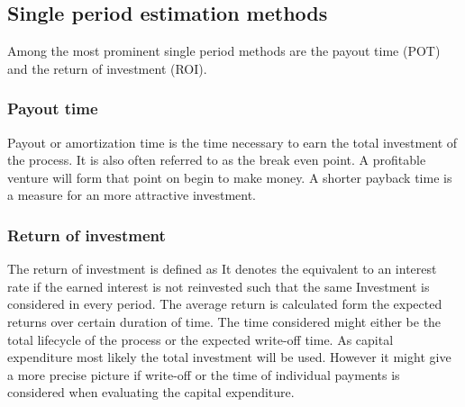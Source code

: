 \subsection{Single period estimation methods}
\label{sec:SinglePeriod}
    Among the most prominent single period methods are the payout time (POT) and the return of
    investment (ROI).

\subsubsection{Payout time}
    Payout or amortization  time is the time necessary to earn the total investment of the process. It is also
    often referred to as the break even point. A profitable venture will form that point on begin to make money.
    A shorter payback time is a measure for an more attractive investment.
\subsubsection{Return of investment}
    The return of investment is defined as
    It denotes the equivalent to an interest rate if the earned interest is not reinvested such that the same
    Investment is considered in every period. The average return is calculated form the expected returns
    over certain duration of time. The time considered might either be the total lifecycle of the process or
    the expected write-off time. As capital expenditure most likely the total investment will be used. However
    it might give a more precise picture if write-off or the time of individual payments is considered when
    evaluating the capital expenditure.

